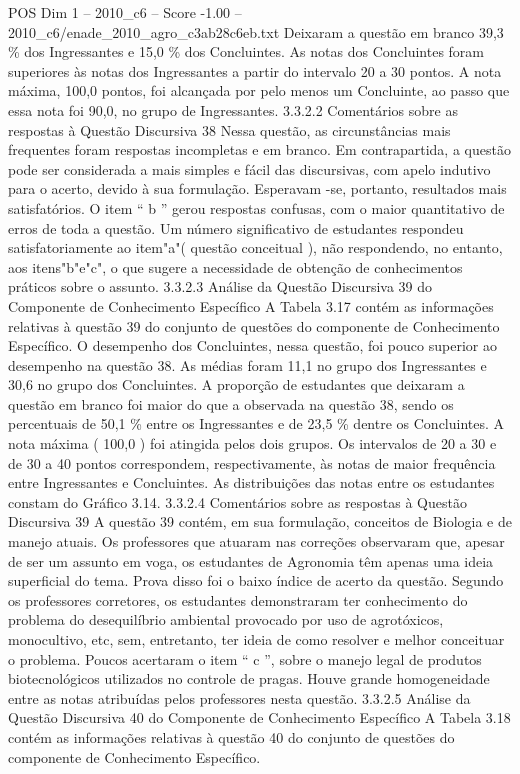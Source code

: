 \begin{textsample}{POS Dim 1 – 2010\_c6 – Score -1.00 – 2010\_c6/enade\_2010\_agro\_c3ab28c6eb.txt}
Deixaram a questão em branco 39,3 \% dos Ingressantes e 15,0 \% dos Concluintes.
As notas dos Concluintes foram superiores às notas dos Ingressantes a partir do intervalo 20 a 30 pontos.
A nota máxima, 100,0 pontos, foi alcançada por pelo menos um Concluinte, ao passo que essa nota foi 90,0, no grupo de Ingressantes. 3.3.2.2 Comentários sobre as respostas à Questão Discursiva 38 Nessa questão, as circunstâncias mais frequentes foram respostas incompletas e em branco.
Em contrapartida, a questão pode ser considerada a mais simples e fácil das discursivas, com apelo indutivo para o acerto, devido à sua formulação.
Esperavam -se, portanto, resultados mais satisfatórios.
O item “ b ” gerou respostas confusas, com o maior quantitativo de erros de toda a questão.
Um número significativo de estudantes respondeu satisfatoriamente ao item"a"( questão conceitual ), não respondendo, no entanto, aos itens"b"e"c", o que sugere a necessidade de obtenção de conhecimentos práticos sobre o assunto. 3.3.2.3 Análise da Questão Discursiva 39 do Componente de Conhecimento Específico A Tabela 3.17 contém as informações relativas à questão 39 do conjunto de questões do componente de Conhecimento Específico.
O desempenho dos Concluintes, nessa questão, foi pouco superior ao desempenho na questão 38.
As médias foram 11,1 no grupo dos Ingressantes e 30,6 no grupo dos Concluintes.
A proporção de estudantes que deixaram a questão em branco foi maior do que a observada na questão 38, sendo os percentuais de 50,1 \% entre os Ingressantes e de 23,5 \% dentre os Concluintes.
A nota máxima ( 100,0 ) foi atingida pelos dois grupos.
Os intervalos de 20 a 30 e de 30 a 40 pontos correspondem, respectivamente, às notas de maior frequência entre Ingressantes e Concluintes.
As distribuições das notas entre os estudantes constam do Gráfico 3.14. 3.3.2.4 Comentários sobre as respostas à Questão Discursiva 39 A questão 39 contém, em sua formulação, conceitos de Biologia e de manejo atuais.
Os professores que atuaram nas correções observaram que, apesar de ser um assunto em voga, os estudantes de Agronomia têm apenas uma ideia superficial do tema.
Prova disso foi o baixo índice de acerto da questão.
Segundo os professores corretores, os estudantes demonstraram ter conhecimento do problema do desequilíbrio ambiental provocado por uso de agrotóxicos, monocultivo, etc, sem, entretanto, ter ideia de como resolver e melhor conceituar o problema.
Poucos acertaram o item “ c ”, sobre o manejo legal de produtos biotecnológicos utilizados no controle de pragas.
Houve grande homogeneidade entre as notas atribuídas pelos professores nesta questão. 3.3.2.5 Análise da Questão Discursiva 40 do Componente de Conhecimento Específico A Tabela 3.18 contém as informações relativas à questão 40 do conjunto de questões do componente de Conhecimento Específico.

\end{textsample}
